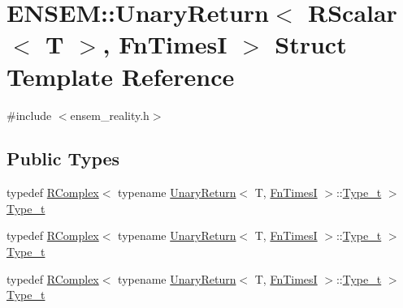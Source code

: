 \hypertarget{structENSEM_1_1UnaryReturn_3_01RScalar_3_01T_01_4_00_01FnTimesI_01_4}{}\section{E\+N\+S\+EM\+:\+:Unary\+Return$<$ R\+Scalar$<$ T $>$, Fn\+TimesI $>$ Struct Template Reference}
\label{structENSEM_1_1UnaryReturn_3_01RScalar_3_01T_01_4_00_01FnTimesI_01_4}


{\ttfamily \#include $<$ensem\+\_\+reality.\+h$>$}

\subsection*{Public Types}
\begin{DoxyCompactItemize}
\item 
typedef \mbox{\hyperlink{classENSEM_1_1RComplex}{R\+Complex}}$<$ typename \mbox{\hyperlink{structENSEM_1_1UnaryReturn}{Unary\+Return}}$<$ T, \mbox{\hyperlink{structENSEM_1_1FnTimesI}{Fn\+TimesI}} $>$\+::\mbox{\hyperlink{structENSEM_1_1UnaryReturn_3_01RScalar_3_01T_01_4_00_01FnTimesI_01_4_ab4ba902ca0b5815b1d94723d80d0b878}{Type\+\_\+t}} $>$ \mbox{\hyperlink{structENSEM_1_1UnaryReturn_3_01RScalar_3_01T_01_4_00_01FnTimesI_01_4_ab4ba902ca0b5815b1d94723d80d0b878}{Type\+\_\+t}}
\item 
typedef \mbox{\hyperlink{classENSEM_1_1RComplex}{R\+Complex}}$<$ typename \mbox{\hyperlink{structENSEM_1_1UnaryReturn}{Unary\+Return}}$<$ T, \mbox{\hyperlink{structENSEM_1_1FnTimesI}{Fn\+TimesI}} $>$\+::\mbox{\hyperlink{structENSEM_1_1UnaryReturn_3_01RScalar_3_01T_01_4_00_01FnTimesI_01_4_ab4ba902ca0b5815b1d94723d80d0b878}{Type\+\_\+t}} $>$ \mbox{\hyperlink{structENSEM_1_1UnaryReturn_3_01RScalar_3_01T_01_4_00_01FnTimesI_01_4_ab4ba902ca0b5815b1d94723d80d0b878}{Type\+\_\+t}}
\item 
typedef \mbox{\hyperlink{classENSEM_1_1RComplex}{R\+Complex}}$<$ typename \mbox{\hyperlink{structENSEM_1_1UnaryReturn}{Unary\+Return}}$<$ T, \mbox{\hyperlink{structENSEM_1_1FnTimesI}{Fn\+TimesI}} $>$\+::\mbox{\hyperlink{structENSEM_1_1UnaryReturn_3_01RScalar_3_01T_01_4_00_01FnTimesI_01_4_ab4ba902ca0b5815b1d94723d80d0b878}{Type\+\_\+t}} $>$ \mbox{\hyperlink{structENSEM_1_1UnaryReturn_3_01RScalar_3_01T_01_4_00_01FnTimesI_01_4_ab4ba902ca0b5815b1d94723d80d0b878}{Type\+\_\+t}}
\end{DoxyCompactItemize}



